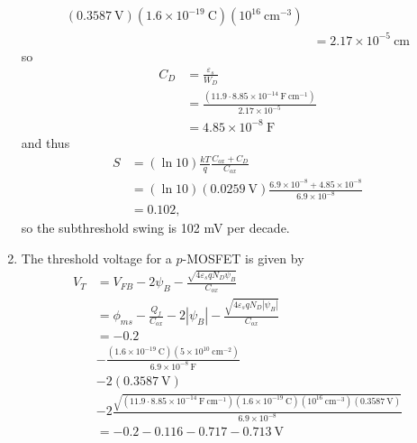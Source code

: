 \documentclass{article}
\begin{document}
\begin{enumerate}
{\begin{align*}
{{                                 (0.3587 ~\mathrm{V})}
                              {(1.6 \times 10^{-19} ~\mathrm{C})
                               (10^{16} ~\mathrm{cm}^{-3})}} \\
                &= 2.17 \times 10^{-5} ~\mathrm{cm}
        \end{align*}
        so
        \begin{align*}
          C_{D} &= \frac{\varepsilon_s}
                        {W_{D}} \\
                &= \frac{(11.9 \cdot 8.85 \times 10^{-14} ~\mathrm{F}~\mathrm{cm}^{-1})}
                        {2.17 \times 10^{-5}} \\
                &= 4.85 \times 10^{-8} ~\mathrm{F}
        \end{align*}
        and thus
        \begin{align*}
          S &= (\ln 10) \frac{kT}{q} \frac{C_{ox} + C_D}{C_{ox}} \\
            &= (\ln 10) (0.0259 ~\mathrm{V})
               \frac{6.9 \times 10^{-8} + 4.85 \times 10^{-8}}
                    {6.9 \times 10^{-8}} \\
            &= 0.102,
        \end{align*}
        so the subthreshold swing is 102 mV per decade.
  }
  \item{The threshold voltage for a $p$-MOSFET is given by
        \begin{align*}
          V_{T} &= V_{FB} - 2\psi_B - \frac{\sqrt{4\varepsilon_s q N_D \psi_B}}{C_{ox}} \\
                &= \phi_{ms} - \frac{Q_f}{C_{ox}} - 2 |\psi_B| - \frac{\sqrt{4\varepsilon_s q N_D |\psi_B|}}{C_{ox}} \\
                &= -0.2 \\
                &- \frac{(1.6 \times 10^{-19} ~\mathrm{C})
                         (5 \times 10^{10} ~\mathrm{cm}^{-2})}
                        {6.9 \times 10^{-8} ~\mathrm{F}} \\
                &- 2(0.3587 ~\mathrm{V}) \\
                &- 2\frac{\sqrt{(11.9 \cdot 8.85 \times 10^{-14} ~\mathrm{F}~\mathrm{cm}^{-1})
                                (1.6 \times 10^{-19} ~\mathrm{C})
                                (10^{16} ~\mathrm{cm}^{-3})
                                (0.3587 ~\mathrm{V})}}
                         {6.9 \times 10^{-8}} \\
                &= -0.2 - 0.116 - 0.717 - 0.713 ~\mathrm{V}\\

\end{align*}}
\end{enumerate}
\end{document}

